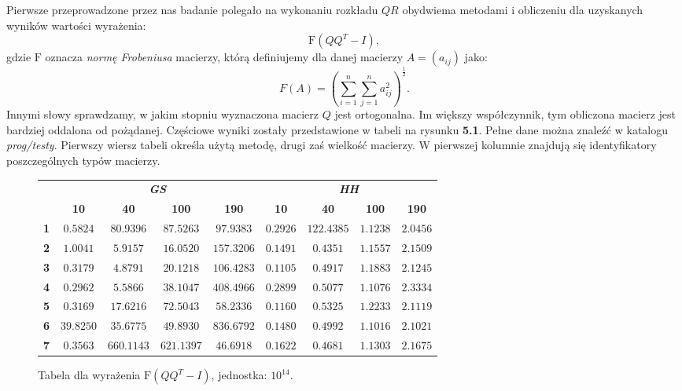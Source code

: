 Pierwsze przeprowadzone przez nas badanie polegało na wykonaniu rozkładu $QR$
obydwiema metodami i obliczeniu dla uzyskanych wyników wartości wyrażenia:
$$\mathrm{F}(QQ^T - I),$$
gdzie $\mathrm{F}$ oznacza \textit{normę Frobeniusa} macierzy, którą definiujemy
dla danej macierzy $A=(a_{ij})$ jako:
$$F(A)=(\sum_{i=1}^{n} \sum_{j=1}^{n} a_{ij}^2)^\frac{1}{2}.$$
Innymi słowy sprawdzamy, w jakim stopniu wyznaczona macierz $Q$ jest ortogonalna.
Im większy
współczynnik, tym obliczona macierz jest bardziej oddalona od pożądanej.
Częściowe wyniki zostały przedstawione
w tabeli na rysunku \textbf{5.1}. Pełne dane można znaleźć w katalogu \textit{prog/testy}.
Pierwszy wiersz tabeli
określa użytą metodę, drugi zaś wielkość macierzy. W pierwszej kolumnie znajdują
się identyfikatory poszczególnych typów
macierzy.
\begin{figure}[h!tb]
\begin{center}
\begin{tabular}{|l||c|c|c|c||c|c|c|c|}
\hline
\multirow{2}{*}{} & \multicolumn{4}{|c||}{\textbf{\textit{GS}}} & \multicolumn{4}{|c|}{\textbf{\textit{HH}}}\\
\cline{2-9}
&\textbf{10} & \textbf{40} & \textbf{100} & \textbf{190} & \textbf{10} & \textbf{40} & \textbf{100} & \textbf{190} \\
\hline
\hline
\textbf{1} & $0.5824$ & $80.9396$ & $87.5263$ & $97.9383$ & $0.2926$ & $122.4385$ & $1.1238$ & $2.0456$ \\
\hline
\textbf{2} & $1.0041$ & $5.9157$ & $16.0520$ & $157.3206$ & $0.1491$ & $0.4351$ & $1.1557$ & $2.1509$ \\
\hline
\textbf{3} & $ 0.3179$ & $4.8791$ & $20.1218$ & $106.4283$ & $0.1105$ & $0.4917$ & $1.1883$ & $2.1245$ \\
\hline
\textbf{4} & $ 0.2962$ & $5.5866$ & $38.1047$ & $408.4966$ & $0.2899$ & $0.5077$ & $1.1076$ & $2.3334$ \\
\hline
\textbf{5} & $ 0.3169$ & $17.6216$ & $72.5043$ & $58.2336$ & $0.1160$ & $0.5325$ & $1.2233$ & $2.1119$ \\
\hline
\textbf{6} & $ 39.8250$ & $35.6775$ & $49.8930$ & $836.6792$ & $0.1480$ & $0.4992$ & $1.1016$ & $2.1021$ \\
\hline
\textbf{7} & $ 0.3563$ & $660.1143$ & $621.1397$ & $46.6918$ & $0.1622$ & $0.4681$ & $1.1303$ & $2.1675$ \\
\hline
\end{tabular}
\caption{Tabela dla wyrażenia $\mathrm{F}(QQ^T - I)$, jednostka: $10^{14}$.} 
\end{center}
\end{figure}

